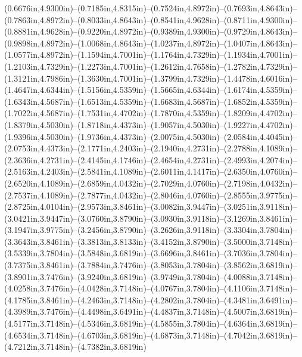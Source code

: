 (0.6676in,4.9300in)--(0.7185in,4.8315in)--(0.7524in,4.8972in)--(0.7693in,4.8643in)--(0.7863in,4.8972in)--(0.8033in,4.8643in)--(0.8541in,4.9628in)--(0.8711in,4.9300in)--(0.8881in,4.9628in)--(0.9220in,4.8972in)--(0.9389in,4.9300in)--(0.9729in,4.8643in)--(0.9898in,4.8972in)--(1.0068in,4.8643in)--(1.0237in,4.8972in)--(1.0407in,4.8643in)--(1.0577in,4.8972in)--(1.1594in,4.7001in)--(1.1764in,4.7329in)--(1.1934in,4.7001in)--(1.2103in,4.7329in)--(1.2273in,4.7001in)--(1.2612in,4.7658in)--(1.2782in,4.7329in)--(1.3121in,4.7986in)--(1.3630in,4.7001in)--(1.3799in,4.7329in)--(1.4478in,4.6016in)--(1.4647in,4.6344in)--(1.5156in,4.5359in)--(1.5665in,4.6344in)--(1.6174in,4.5359in)--(1.6343in,4.5687in)--(1.6513in,4.5359in)--(1.6683in,4.5687in)--(1.6852in,4.5359in)--(1.7022in,4.5687in)--(1.7531in,4.4702in)--(1.7870in,4.5359in)--(1.8209in,4.4702in)--(1.8379in,4.5030in)--(1.8718in,4.4373in)--(1.9057in,4.5030in)--(1.9227in,4.4702in)--(1.9396in,4.5030in)--(1.9736in,4.4373in)--(2.0075in,4.5030in)--(2.0584in,4.4045in)--(2.0753in,4.4373in)--(2.1771in,4.2403in)--(2.1940in,4.2731in)--(2.2788in,4.1089in)--(2.3636in,4.2731in)--(2.4145in,4.1746in)--(2.4654in,4.2731in)--(2.4993in,4.2074in)--(2.5163in,4.2403in)--(2.5841in,4.1089in)--(2.6011in,4.1417in)--(2.6350in,4.0760in)--(2.6520in,4.1089in)--(2.6859in,4.0432in)--(2.7029in,4.0760in)--(2.7198in,4.0432in)--(2.7537in,4.1089in)--(2.7877in,4.0432in)--(2.8046in,4.0760in)--(2.8555in,3.9775in)--(2.8725in,4.0104in)--(2.9573in,3.8461in)--(3.0082in,3.9447in)--(3.0251in,3.9118in)--(3.0421in,3.9447in)--(3.0760in,3.8790in)--(3.0930in,3.9118in)--(3.1269in,3.8461in)--(3.1947in,3.9775in)--(3.2456in,3.8790in)--(3.2626in,3.9118in)--(3.3304in,3.7804in)--(3.3643in,3.8461in)--(3.3813in,3.8133in)--(3.4152in,3.8790in)--(3.5000in,3.7148in)--(3.5339in,3.7804in)--(3.5848in,3.6819in)--(3.6696in,3.8461in)--(3.7036in,3.7804in)--(3.7375in,3.8461in)--(3.7884in,3.7476in)--(3.8053in,3.7804in)--(3.8562in,3.6819in)--(3.8901in,3.7476in)--(3.9240in,3.6819in)--(3.9749in,3.7804in)--(4.0088in,3.7148in)--(4.0258in,3.7476in)--(4.0428in,3.7148in)--(4.0767in,3.7804in)--(4.1106in,3.7148in)--(4.1785in,3.8461in)--(4.2463in,3.7148in)--(4.2802in,3.7804in)--(4.3481in,3.6491in)--(4.3989in,3.7476in)--(4.4498in,3.6491in)--(4.4837in,3.7148in)--(4.5007in,3.6819in)--(4.5177in,3.7148in)--(4.5346in,3.6819in)--(4.5855in,3.7804in)--(4.6364in,3.6819in)--(4.6534in,3.7148in)--(4.6703in,3.6819in)--(4.6873in,3.7148in)--(4.7042in,3.6819in)--(4.7212in,3.7148in)--(4.7382in,3.6819in) 